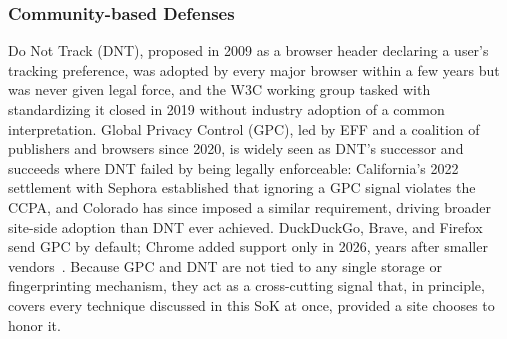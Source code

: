 \subsubsection{Community-based Defenses}
\label{sec:mixed-defenses-community}


Do Not Track (DNT), proposed in 2009 as a browser header declaring a user's tracking preference, was adopted by every major browser within a few years but was never given legal force, and the W3C working group tasked with standardizing it closed in 2019 without industry adoption of a common interpretation.
%
Global Privacy Control (GPC), led by EFF and a coalition of publishers and browsers since 2020, is widely seen as DNT's successor and succeeds where DNT failed by being legally enforceable: California's 2022 settlement with Sephora established that ignoring a GPC signal violates the CCPA, and Colorado has since imposed a similar requirement, driving broader site-side adoption than DNT ever achieved.
%
DuckDuckGo, Brave, and Firefox send GPC by default; Chrome added support only in 2026, years after smaller vendors~\cite{googleGlobalPrivacyControl2025}.
%
Because GPC and DNT are not tied to any single storage or fingerprinting mechanism, they act as a cross-cutting signal that, in principle, covers every technique discussed in this SoK at once, provided a site chooses to honor it.
